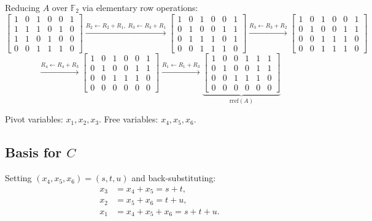 Reducing $A$ over $\mathbb{F}_2$ via elementary row operations:
\[
\begin{bmatrix}
    1 & 0 & 1 & 0 & 0 & 1 \\
    1 & 1 & 1 & 0 & 1 & 0 \\
    1 & 1 & 0 & 1 & 0 & 0 \\
    0 & 0 & 1 & 1 & 1 & 0
\end{bmatrix}
\xrightarrow{R_2 \leftarrow R_2+R_1,\; R_3 \leftarrow R_3+R_1}
\begin{bmatrix}
    1 & 0 & 1 & 0 & 0 & 1 \\
    0 & 1 & 0 & 0 & 1 & 1 \\
    0 & 1 & 1 & 1 & 0 & 1 \\
    0 & 0 & 1 & 1 & 1 & 0
\end{bmatrix}
\xrightarrow{R_3 \leftarrow R_3+R_2}
\begin{bmatrix}
    1 & 0 & 1 & 0 & 0 & 1 \\
    0 & 1 & 0 & 0 & 1 & 1 \\
    0 & 0 & 1 & 1 & 1 & 0 \\
    0 & 0 & 1 & 1 & 1 & 0
\end{bmatrix}
\]
\[
\xrightarrow{R_4 \leftarrow R_4+R_3}
\begin{bmatrix}
    1 & 0 & 1 & 0 & 0 & 1 \\
    0 & 1 & 0 & 0 & 1 & 1 \\
    0 & 0 & 1 & 1 & 1 & 0 \\
    0 & 0 & 0 & 0 & 0 & 0
\end{bmatrix}
\xrightarrow{R_1 \leftarrow R_1+R_3}
\underbrace{\begin{bmatrix}
    1 & 0 & 0 & 1 & 1 & 1 \\
    0 & 1 & 0 & 0 & 1 & 1 \\
    0 & 0 & 1 & 1 & 1 & 0 \\
    0 & 0 & 0 & 0 & 0 & 0
\end{bmatrix}}_{\mathrm{rref}(A)}
\]

Pivot variables: $x_1, x_2, x_3$. Free variables: $x_4, x_5, x_6$.

\subsection{Basis for \texorpdfstring{$C$}{C}}

Setting $(x_4, x_5, x_6) = (s, t, u)$ and back-substituting:
\begin{align*}
    x_3 &= x_4 + x_5 = s + t, \\
    x_2 &= x_5 + x_6 = t + u, \\
    x_1 &= x_4 + x_5 + x_6 = s + t + u.
\end{align*}

